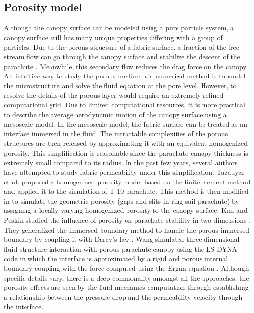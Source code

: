 \subsection{Porosity model}
Although the canopy surface can be modeled using a pure particle system, a canopy surface still has many unique properties differing with a group of particles. 
Due to the porous structure of a
fabric surface, a fraction of the free-stream flow can go through the canopy
surface and stabilize the descent of the parachute \cite{Johari05}. 
Meanwhile, this secondary flow reduces the drag force on the canopy. 
An intuitive way to study the porous medium via numerical method is to model the microstructure and solve the fluid equation at the pore level. However, to resolve the details of the porous layer would require an extremely 
refined computational grid. Due to limited computational resources, it 
is more practical to describe the average aerodynamic motion of the 
canopy surface using a mesoscale model. In the mesoscale model, the 
fabric surface can be treated as an interface immersed in the fluid.
The intractable complexities of the porous structures are then released by 
approximating it with an equivalent homogenized porosity.  
This simplification is reasonable since the parachute canopy thickness is
extremely small compared to its radius. In the past few years, 
several authors have attempted to study fabric permeability
under this simplification. Tazduyar et al. \cite{Tezduyar2008Fluid} proposed a
homogenized porosity model based on the finite element method and applied it 
to the simulation of T-10 parachute. This method is then modified in \cite{Takizawa2012Computational} to simulate the geometric porosity (gaps and slits in ring-sail parachute) by assigning a locally-varying homogenized porosity to the canopy surface. 
Kim and Peskin studied the influence of porosity on
parachute stability in two dimensions \cite{Kim2006TwoDimensional}. They generalized
the immersed boundary method to handle the porous immersed boundary by 
coupling it with Darcy's law \cite{Nield2013}.  Wang \cite{wang2006porous} simulated 
three-dimensional fluid-structure interaction with porous parachute canopy using the
LS-DYNA code in which the interface is approximated by a rigid and porous
internal boundary coupling with the force computed using the Ergun equation \cite{Nield2013}. Although specific details vary, there is a deep commonality amongst all the approaches: the porosity effects are seen by the fluid mechanics computation through establishing a relationship between the pressure drop and the permeability velocity through the interface.

